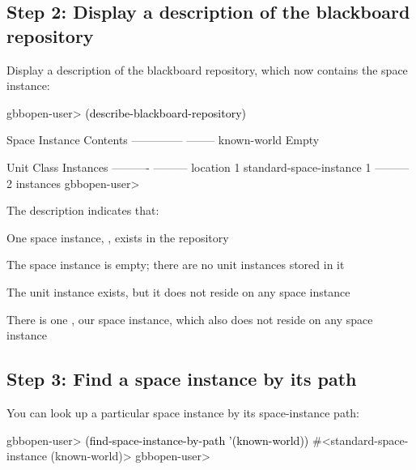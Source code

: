 \documentclass[10pt,twoside,english,pdftex]{article}
\begin{document}
\subsection*{Step 2: Display a description of the blackboard repository}

%
%
%
Display a description of the blackboard repository, which now contains the
 space instance:
%
\W\supp
\begin{example}
\textcolor{darkergray}{%
  gbbopen-user> \textcolor{black}{(describe-blackboard-repository)}
  
  Space Instance                Contents
  --------------                --------
  known-world                   Empty

  Unit Class                    Instances
  ----------                    ---------
  location                              1
  standard-space-instance               1
                                ---------
                                        2 instances
  gbbopen-user>}
\end{example}

The description indicates that:
\begin{tightitemize}
\item One space instance, , exists in the repository
\item The  space instance is empty; there are no unit
  instances stored in it
\item The  unit instance exists, but it does not reside
  on any space instance
\item There is one , our
   space instance, which also does not reside on any
  space instance
\end{tightitemize}
 
\subsection*{Step 3: Find a space instance by its path}

%
%
%
You can look up a particular space instance by its space-instance path:
%
\W\supp
\begin{example}
\textcolor{darkergray}{%
  gbbopen-user> \textcolor{black}{(find-space-instance-by-path '(known-world))}
  #<standard-space-instance (known-world)>
  gbbopen-user>}
\end{example}
\end{document}
